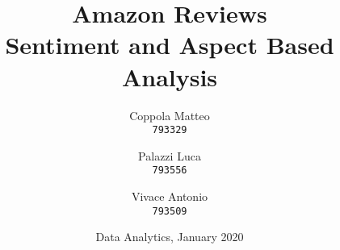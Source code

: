 \documentclass{report}
\begin{document}
\title{%
  \Huge Amazon Reviews \\
  \large Sentiment and Aspect Based Analysis\\
    }
\author{
  Coppola Matteo\\
  \texttt{793329}
  \and
  Palazzi Luca\\
  \texttt{793556}
   \and
  Vivace Antonio\\
  \texttt{793509}
}
\date{Data Analytics, January 2020}
\maketitle


\tableofcontents
\listoffigures
\listoftables
\pagebreak






\newpage
{}
\printbibliography
\end{document}

